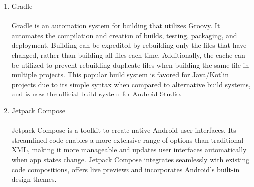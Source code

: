 \begin{enumerate}[label=\arabic*]
\begin{enumerate}[label=\alph*.]
                \item Gradle\\
                \\
                Gradle is an automation system for building that utilizes Groovy. It automates the compilation and creation of builds, testing, packaging, and deployment. Building can be expedited by rebuilding only the files that have changed, rather than building all files each time. Additionally, the cache can be utilized to prevent rebuilding duplicate files when building the same file in multiple projects. This popular build system is favored for Java/Kotlin projects due to its simple syntax when compared to alternative build systems, and is now the official build system for Android Studio.\\

                \item Jetpack Compose\\
                \\
                Jetpack Compose is a toolkit to create native Android user interfaces. Its streamlined code enables a more extensive range of options than traditional XML, making it more manageable and updates user interfaces automatically when app states change. Jetpack Compose integrates seamlessly with existing code compositions, offers live previews and incorporates Android's built-in design themes.\\


\end{enumerate}
\end{enumerate}
